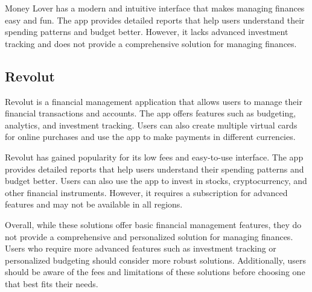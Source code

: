 Money Lover has a modern and intuitive interface that makes managing finances easy and fun. The app provides detailed reports that help users understand their spending patterns and budget better. However, it lacks advanced investment tracking and does not provide a comprehensive solution for managing finances.

\subsection{Revolut}
Revolut is a financial management application that allows users to manage their financial transactions and accounts. The app offers features such as budgeting, analytics, and investment tracking. Users can also create multiple virtual cards for online purchases and use the app to make payments in different currencies.

Revolut has gained popularity for its low fees and easy-to-use interface. The app provides detailed reports that help users understand their spending patterns and budget better. Users can also use the app to invest in stocks, cryptocurrency, and other financial instruments. However, it requires a subscription for advanced features and may not be available in all regions.

Overall, while these solutions offer basic financial management features, they do not provide a comprehensive and personalized solution for managing finances. Users who require more advanced features such as investment tracking or personalized budgeting should consider more robust solutions. Additionally, users should be aware of the fees and limitations of these solutions before choosing one that best fits their needs.
